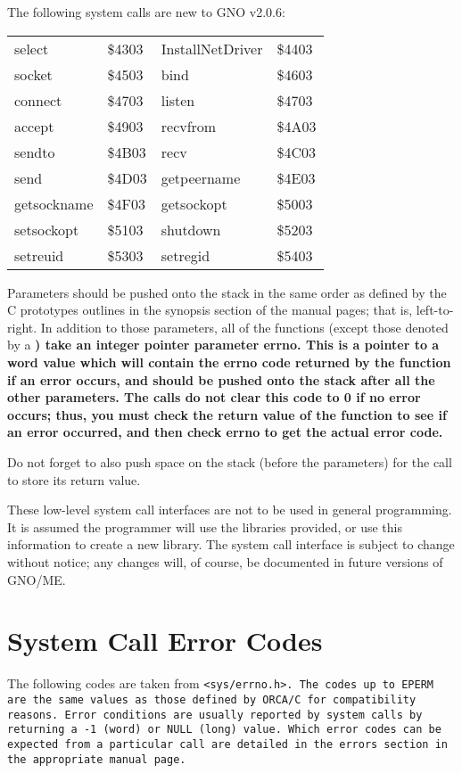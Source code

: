 \documentclass{report}
\begin{document}
The following system calls are new to GNO v2.0.6:

\begin{tabular}{llll}
	select			& \$4303	&
	InstallNetDriver	& \$4403	\\
	socket			& \$4503	&
	bind			& \$4603	\\
	connect			& \$4703	&
	listen			& \$4703	\\
	accept			& \$4903	&
	recvfrom		& \$4A03	\\
	sendto			& \$4B03	&
	recv			& \$4C03	\\
	send			& \$4D03	&
	getpeername		& \$4E03	\\
	getsockname		& \$4F03	&
	getsockopt		& \$5003	\\
	setsockopt		& \$5103	&
	shutdown		& \$5203	\\
	setreuid		& \$5303	&
	setregid		& \$5403	\\
\end{tabular}

Parameters should be pushed onto the stack
in the same order as defined by the C prototypes outlines in the
synopsis section of the manual pages; that is, left-to-right. In
addition to those parameters, all of the functions (except those
denoted by a \bf *\rm) take an integer pointer parameter \bf errno\rm.
This is a pointer to a word value which will contain the \bf errno \rm
code returned by the function if an error occurs, and should be
pushed onto the stack after all the other parameters. The calls
do not clear this code to 0 if no error occurs; thus, you must
check the return value of the function to see if an error
occurred, and then check errno to get the actual error code.

Do not forget to also push space on the
stack (before the parameters) for the call to store its return
value.

These low-level system call interfaces are
not to be used in general programming. It is assumed the
programmer will use the libraries provided, or use this
information to create a new library. The system call interface is
subject to change without notice; any changes will, of course, be
documented in future versions of GNO/ME.

\section{System Call Error Codes}

The following codes are taken from \tt <sys/errno.h>\rm. The
codes up to EPERM are the same values as those defined by ORCA/C
for compatibility reasons. Error conditions are usually reported
by system calls by returning a -1 (word) or NULL (long) value.
Which error codes can be expected from a particular call are
detailed in the errors section in the appropriate manual page.
\end{document}
